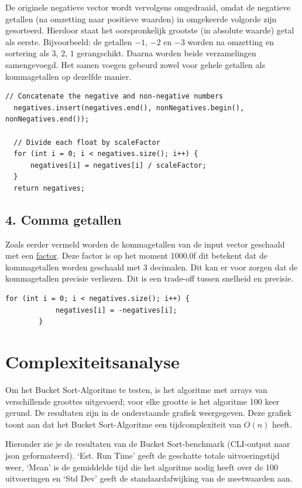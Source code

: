 \documentclass{article}
\begin{document}
De originele negatieve vector wordt vervolgens omgedraaid, 
omdat de negatieve getallen (na omzetting naar positieve waarden) in omgekeerde volgorde zijn gesorteerd. 
Hierdoor staat het oorspronkelijk grootste (in absolute waarde) getal als eerste.  
Bijvoorbeeld: de getallen \(-1\), \(-2\) en \(-3\) worden na omzetting en sortering als \(3\), \(2\), \(1\) gerangschikt. 
Daarna worden beide verzamelingen samengevoegd. Het samen voegen gebeurd zowel voor gehele getallen als kommagetallen op dezelfde manier.
\begin{lstlisting}[caption={getallen samenvoegen}, label={lst:negatives}]
  // Concatenate the negative and non-negative numbers
  negatives.insert(negatives.end(), nonNegatives.begin(), nonNegatives.end());

  // Divide each float by scaleFactor
  for (int i = 0; i < negatives.size(); i++) {
      negatives[i] = negatives[i] / scaleFactor;
  }
  return negatives;  
\end{lstlisting}



\subsection*{4. Comma getallen}
Zoals eerder vermeld worden de kommagetallen van de input vector geschaald met een \hyperref[lst:negatives]{factor}. 
Deze factor is op het moment 1000.0f dit betekent dat de kommagetallen worden geschaald met 3 decimalen. 
Dit kan er voor zorgen dat de kommagetallen precisie verliezen. Dit is een trade-off tussen snelheid en precisie.

\begin{lstlisting}[caption={Terug schalen}, label={lst:factor}]
  for (int i = 0; i < negatives.size(); i++) {
            negatives[i] = -negatives[i];
        }
\end{lstlisting}

\newpage
\section{Complexiteitsanalyse}
Om het Bucket Sort-Algoritme te testen, is het algoritme met arrays van verschillende groottes uitgevoerd; voor elke grootte is het algoritme 100 keer gerund.  
De resultaten zijn in de onderstaande grafiek weergegeven. Deze grafiek toont aan dat het Bucket Sort-Algoritme een tijdcomplexiteit van \(O(n)\) heeft.

Hieronder zie je de resultaten van de Bucket Sort-benchmark (CLI-output naar json geformateerd). 
‘Est. Run Time’ geeft de geschatte totale uitvoeringstijd weer, 
‘Mean’ is de gemiddelde tijd die het algoritme nodig heeft over de 100 uitvoeringen en ‘Std Dev’ geeft de standaardafwijking van de meetwaarden aan.
\end{document}
